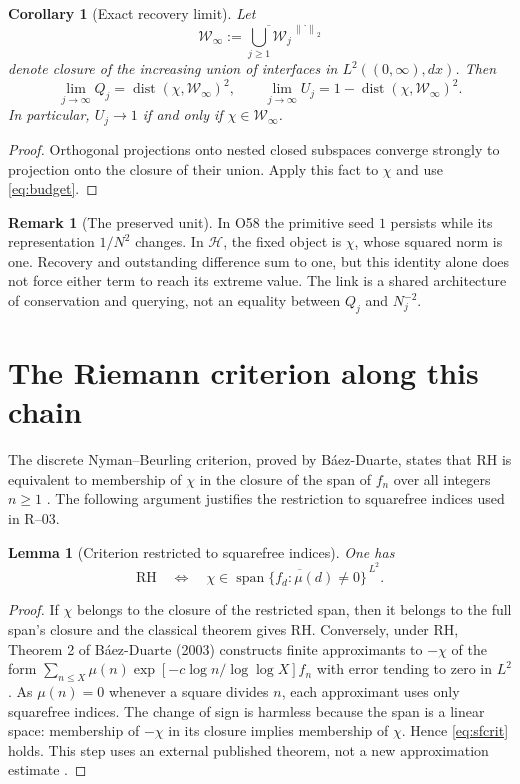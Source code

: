 \documentclass[11pt,a4paper]{article}
\theoremstyle{mine}
\newtheorem{lemma}[theorem]{Lemma}
\newtheorem{corollary}[theorem]{Corollary}
\theoremstyle{definition}
\newtheorem{remark}[theorem]{Remark}
\newcommand{\HH}{\mathcal H}
\newcommand{\WW}{\mathcal W}
\newcommand{\norm}[1]{\left\lVert#1\right\rVert}
\newcommand{\dist}{\operatorname{dist}}
\newcommand{\RH}{\mathrm{RH}}
\begin{document}
\begin{corollary}[Exact recovery limit]\label{co:closure}
Let
\[
\WW_\infty:=\overline{\bigcup_{j\ge1}\WW_j}^{\,\norm{\cdot}_2}
\]
denote closure of the increasing union of interfaces in $L^2((0,\infty),dx)$. Then
\begin{equation}\label{eq:limit}
\boxed{\ \lim_{j\to\infty} Q_j=\dist(\chi,\WW_\infty)^2,\qquad
\lim_{j\to\infty}U_j=1-\dist(\chi,\WW_\infty)^2.\ }
\end{equation}
In particular, $U_j\to1$ if and only if $\chi\in\WW_\infty$.
\end{corollary}
\begin{proof}
Orthogonal projections onto nested closed subspaces converge strongly to projection onto the closure of their union. Apply this fact to $\chi$ and use \eqref{eq:budget}.
\end{proof}

\begin{remark}[The preserved unit]
In O58 the primitive seed $1$ persists while its representation $1/N^2$ changes. In $\HH$, the fixed object is $\chi$, whose squared norm is one. Recovery and outstanding difference sum to one, but this identity alone does not force either term to reach its extreme value. The link is a shared architecture of conservation and querying, not an equality between $Q_j$ and $N_j^{-2}$.
\end{remark}

\section{The Riemann criterion along this chain}

The discrete Nyman--Beurling criterion, proved by B\'aez-Duarte, states that RH is equivalent to membership of $\chi$ in the closure of the span of $f_n$ over all integers $n\ge1$ \cite{BD2003}. The following argument justifies the restriction to squarefree indices used in R--03.

\begin{lemma}[Criterion restricted to squarefree indices]\label{le:squarefree}
One has
\begin{equation}\label{eq:sfcrit}
\RH\quad\Longleftrightarrow\quad
\chi\in\overline{\operatorname{span}\{f_d:\mu(d)\ne0\}}^{\,L^2}.
\end{equation}
\end{lemma}
\begin{proof}
If $\chi$ belongs to the closure of the restricted span, then it belongs to the full span's closure and the classical theorem gives RH. Conversely, under RH, Theorem 2 of B\'aez-Duarte (2003) constructs finite approximants to $-\chi$ of the form
\(
\sum_{n\le X}\mu(n)\exp[-c\log n/\log\log X] f_n
\)
with error tending to zero in $L^2$. As $\mu(n)=0$ whenever a square divides $n$, each approximant uses only squarefree indices. The change of sign is harmless because the span is a linear space: membership of $-\chi$ in its closure implies membership of $\chi$. Hence \eqref{eq:sfcrit} holds. This step uses an external published theorem, not a new approximation estimate \cite[Theorem~2]{BD2003}.
\end{proof}
\end{document}
